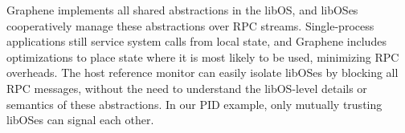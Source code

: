 


Graphene implements all shared abstractions in the libOS, and libOSes cooperatively manage these abstractions
over RPC streams.
Single-process applications still service system calls from local state, and Graphene 
includes optimizations to place state where it is most likely to be used,
minimizing RPC overheads.
The host reference monitor can easily isolate libOSes
by 
blocking all
RPC messages, %
without the need to understand the libOS-level details or semantics of these abstractions.
In our PID example, only mutually trusting libOSes can signal each other.



